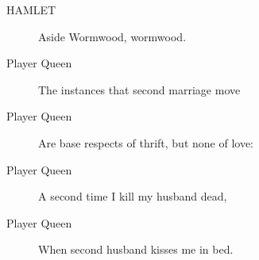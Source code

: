 \documentclass{article}
\begin{document}
\begin{description}
            
\item[HAMLET] 
               Aside  Wormwood, wormwood.
\end{description}
          
\begin{description}
            
\item[Player Queen] The instances that second marriage move
\item[Player Queen] Are base respects of thrift, but none of love:
\item[Player Queen] A second time I kill my husband dead,
\item[Player Queen] When second husband kisses me in bed.
\end{description}
          
\end{document}

